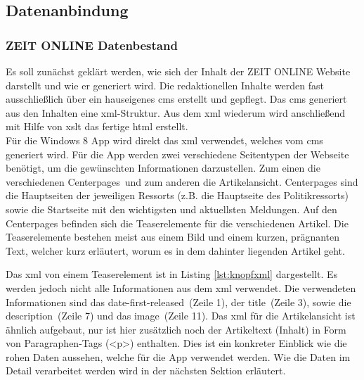 \documentclass[12pt,a4paper,bibtotoc,abstracton]{scrartcl}
\begin{document}
\subsection{Datenanbindung}
\label{subsec:datenanbindung}

\subsubsection{ZEIT ONLINE Datenbestand}
\label{subsubsec:zondatenbestand}
Es soll zunächst geklärt werden, wie sich der Inhalt der ZEIT ONLINE Website darstellt und wie er generiert wird. Die redaktionellen Inhalte werden fast ausschließlich über ein hauseigenes \ac{cms} erstellt und gepflegt. Das \ac{cms} generiert aus den Inhalten eine \ac{xml}-Struktur. Aus dem \ac{xml} wiederum wird anschließend mit Hilfe von \ac{xslt} das fertige \ac{html} erstellt.\\
Für die Windows 8 App wird direkt das \ac{xml} verwendet, welches vom \ac{cms} generiert wird. Für die App werden zwei verschiedene Seitentypen der Webseite benötigt, um die gewünschten Informationen darzustellen. Zum einen die verschiedenen \glqq Centerpages\grqq\ und zum anderen die Artikelansicht. Centerpages sind die Hauptseiten der jeweiligen Ressorts (z.B. die Hauptseite des Politikressorts) sowie die Startseite mit den wichtigsten und aktuellsten Meldungen. Auf den Centerpages befinden sich die Teaserelemente für die verschiedenen Artikel. Die Teaserelemente bestehen meist aus einem Bild und einem kurzen, prägnanten Text, welcher kurz erläutert, worum es in dem dahinter liegenden Artikel geht.\\

\begin{minipage}{\linewidth}

\end{minipage}

Das \ac{xml} von einem Teaserelement ist in Listing \ref{lst:knopfxml} dargestellt. Es werden jedoch nicht alle Informationen aus dem \ac{xml} verwendet. Die verwendeten Informationen sind das \glqq date-first-released\grqq\ (Zeile 1), der \glqq title\grqq\ (Zeile 3), sowie die \glqq description\grqq\ (Zeile 7) und das \glqq image\grqq\ (Zeile 11). Das \ac{xml} für die Artikelansicht ist ähnlich aufgebaut, nur ist hier zusätzlich noch der Artikeltext (Inhalt) in Form von Paragraphen-Tags (<p>) enthalten. Dies ist ein konkreter Einblick wie die rohen Daten aussehen, welche für die App verwendet werden. Wie die Daten im Detail verarbeitet werden wird in der nächsten Sektion erläutert.
\end{document}
